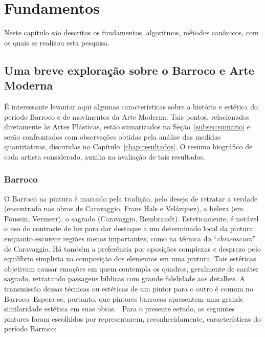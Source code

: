 
\afterpage{\blankpage}
\chapter{Fundamentos}
\label{cap:fundamentos}

Neste capítulo são descritos os fundamentos, algoritmos, métodos canônicos,
com os quais se realizou esta pesquisa.


\section{Uma breve exploração sobre o Barroco e Arte Moderna}
\label{sec:breve}

É interessante levantar aqui algumas características sobre a história
e estética do período Barroco e de movimentos da Arte Moderna. Tais
pontos, relacionados diretamente às Artes Plásticas, estão sumarizados
na Seção~\ref{subsec:sumario} e serão confrontados com observações
obtidas pela análise das medidas quantitativas, discutidas no
Capítulo~\ref{chap:resultados}. O resumo biográfico de cada artista
considerado, auxilia na avaliação de tais resultados.

\subsection{Barroco}

O Barroco na pintura é marcado pela tradição, pelo desejo de retratar
a verdade (encontrado nas obras de Caravaggio, Frans Hals e
Velázquez), a beleza (em Poussin, Vermeer), o sagrado (Caravaggio,
Rembrandt). Esteticamente, é notável o uso do contraste de luz para
dar destaque a um determinado local da pintura enquanto escurece
regiões menos importantes, como na técnica do ``\textit{chiaroscuro}''
de Caravaggio. Há também a preferência por oposições complexas e desprezo pelo
equilíbrio simplista na composição dos elementos em uma
pintura. Tais estéticas objetivam causar emoções em quem contempla
os quadros, geralmente de caráter sagrado, retratando passagens
bíblicas com grande fidelidade aos detalhes. A transmissão dessas
técnicas ou estéticas de um pintor para o outro é comum no
Barroco. Espera-se, portanto, que pintores barrocos apresentem uma
grande similaridade estética em suas
obras.~\cite{gombrich,hills,gardner} Para o presente estudo, os
seguintes pintores foram escolhidos por representarem,
reconhecidamente, características do período Barroco:

